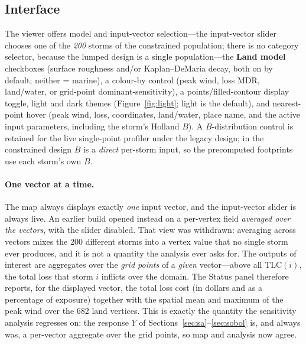 \documentclass[11pt]{article}
\begin{document}
\subsection{Interface}
The viewer offers model and input-vector selection---the input-vector slider chooses
one of the \emph{200} storms of the constrained population; there is no category
selector, because the lumped design is a single population---the \textbf{Land model}
checkboxes (surface roughness and/or Kaplan--DeMaria decay, both on by default;
neither = marine), a colour-by control
(peak wind, loss MDR, land/water, or grid-point dominant-sensitivity), a
points/filled-contour display toggle,
light and dark themes (Figure~\ref{fig:light}; light is the default), and
nearest-point hover (peak wind, loss, coordinates, land/water, place name, and the
active input parameters, including the storm's Holland $B$). A $B$-distribution
control is retained for the live single-point profiler under the legacy design; in
the constrained design $B$ is a \emph{direct} per-storm input, so the precomputed
footprints use each storm's own $B$.

\paragraph{One vector at a time.} The map always displays exactly \emph{one} input
vector, and the input-vector slider is always live. An earlier build opened instead
on a per-vertex field \emph{averaged over the vectors}, with the slider
disabled. That view was withdrawn: averaging across vectors mixes the 200 different
storms into a vertex value that no single storm ever produces, and it is not a
quantity the analysis ever asks for. The outputs of interest are aggregates over the
\emph{grid points} of a \emph{given} vector---above all $\mathrm{TLC}(i)$, the total
loss that storm $i$ inflicts over the domain. The Status panel therefore reports,
for the displayed vector, the total loss cost (in dollars and as a percentage of
exposure) together with the spatial mean and maximum of the peak wind over the 682
land vertices. This is exactly the quantity the sensitivity analysis regresses on:
the response $Y$ of Sections~\ref{sec:sa}--\ref{sec:sobol} is, and always was, a
per-vector aggregate over the grid points, so map and analysis now agree.
\end{document}
